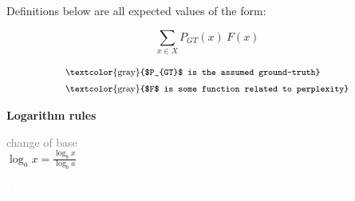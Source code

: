 \documentclass[a4paper,fleqn,reqno,12pt,landscape]{article}
\newcommand{\mygray}[1]{\textcolor{gray}{#1}}
\newcommand{\myremark}[1]{{\footnotesize\mygray{#1}}}
\begin{document}
\begin{paracol}{2}
\begin{minipage}[t]{0.5\linewidth}
    Definitions below are all expected values of the form: \\
    \begin{minipage}[t]{0.3\linewidth}
      \strut\vspace*{-\baselineskip}\newline
      \begin{equation*}
        \sum_{x \in X} P_{GT}(x) \ F(x)
      \end{equation*}
    \end{minipage}
    \hspace*{-0.5cm}
    \begin{minipage}[t]{0.5\linewidth}
      \strut\vspace*{-\baselineskip}\newline
      \vspace*{-0.75cm}
      \begin{align*}
        & \text{\myremark{$P_{GT}$ is the assumed ground-truth}}\\
        & \text{\myremark{$F$ is some function related to perplexity}}
      \end{align*}
    \end{minipage}
  \end{minipage}
  \hfill
  \begin{minipage}[t]{0.23\linewidth}
    \strut\vspace*{-\baselineskip}\newline
    \textbf{Logarithm rules}

    \medskip

    \myremark{change of base}\\
    \medskip
    $\log_{a} x = \frac{\log_{b} x}{\log_{b} a}$
  \end{minipage}
  \hfill
  \begin{minipage}[t]{0.2\linewidth}
    \strut\vspace*{-\baselineskip}\newline
    {\textcolor{white}{\textbf{Logarithm rules}}}

    \medskip


\end{minipage}
\end{paracol}
\end{document}
